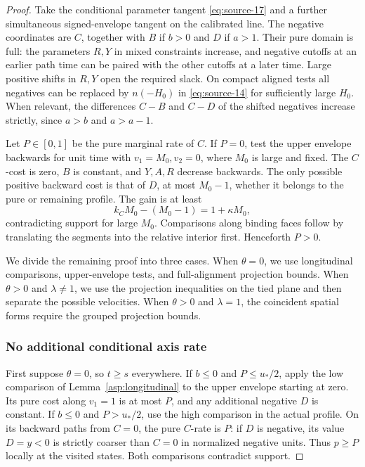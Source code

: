 \begin{proof}
Take the conditional parameter tangent \eqref{eq:source-17} and a further
simultaneous signed-envelope tangent on the calibrated line. The negative
coordinates are \(C\), together with \(B\) if \(b>0\) and \(D\) if
\(a>1\). Their pure domain is full: the parameters \(R,Y\) in mixed
constraints increase, and negative cutoffs at an earlier path time can be
paired with the other cutoffs at a later time. Large positive shifts in
\(R,Y\) open the required slack. On compact aligned tests all negatives can
be replaced by \(n(-H_0)\) in \eqref{eq:source-14} for sufficiently large
\(H_0\). When relevant, the differences \(C-B\) and \(C-D\) of the
shifted negatives increase strictly, since \(a>b\) and \(a>a-1\).

Let \(P\in[0,1]\) be the pure marginal rate of \(C\). If \(P=0\), test
the upper envelope backwards for unit time with \(v_1=M_0,v_2=0\),
where \(M_0\) is large and fixed. The \(C\)-cost is zero, \(B\) is
constant, and \(Y,A,R\) decrease backwards. The only possible positive
backward cost is that of \(D\), at most \(M_0-1\), whether it belongs
to the pure or remaining profile. The gain is at least
\[
k_CM_0-(M_0-1)=1+\kappa M_0,
\]
contradicting support for large \(M_0\). Comparisons along binding faces
follow by translating the segments into the relative interior first.
Henceforth \(P>0\).

We divide the remaining proof into three cases. When \(\theta=0\),
we use longitudinal comparisons, upper-envelope tests, and full-alignment
projection bounds. When \(\theta>0\) and \(\lambda\ne1\), we use the
projection inequalities on the tied plane and then separate the possible
velocities. When \(\theta>0\) and \(\lambda=1\), the coincident spatial
forms require the grouped projection bounds.

\subsubsection*{No additional conditional axis rate}

First suppose \(\theta=0\), so \(t\ge s\) everywhere. If \(b\le0\)
and \(P\le u_*/2\), apply the low comparison of
Lemma~\ref{asp:longitudinal} to the upper envelope starting at zero.
Its pure cost along \(v_1=1\) is at most \(P\), and any additional
negative \(D\) is constant. If \(b\le0\) and \(P>u_*/2\), use the
high comparison in the actual profile. On its backward paths from
\(C=0\), the pure \(C\)-rate is \(P\): if \(D\) is negative, its
value \(D=y<0\) is strictly coarser than \(C=0\) in normalized negative
units. Thus \(p\ge P\) locally at the visited states. Both comparisons
contradict support.


\end{proof}
